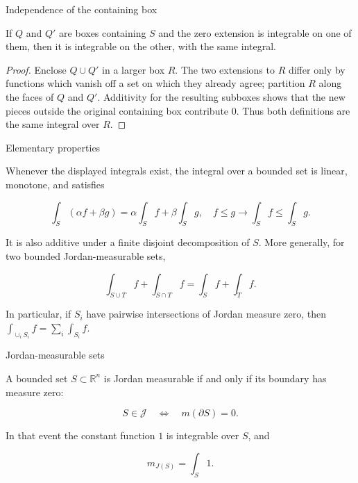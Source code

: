 \begin{lemma}{Independence of the containing box}

If \(Q\) and \(Q'\) are boxes containing \(S\) and the zero extension is integrable on one of them, then it is integrable on the other, with the same integral.

\end{lemma}

\begin{proof}

Enclose \(Q \cup Q'\) in a larger box \(R\). The two extensions to \(R\) differ only by functions which vanish off a set on which they already agree; partition \(R\) along the faces of \(Q\) and \(Q'\). Additivity for the resulting subboxes shows that the new pieces outside the original containing box contribute \(0\). Thus both definitions are the same integral over \(R\).

\end{proof}

\begin{proposition}{Elementary properties}

Whenever the displayed integrals exist, the integral over a bounded set is linear, monotone, and satisfies

\[\int_{S}\left( {\alpha f + \beta g} \right) = \alpha\int_{S}f + \beta\int_{S}g,\quad f \leq g\rightarrow\int_{S}f \leq \int_{S}g.\]

It is also additive under a finite disjoint decomposition of \(S\). More generally, for two bounded Jordan-measurable sets,

\[\int_{S \cup T}f + \int_{S \cap T}f = \int_{S}f + \int_{T}f.\]

In particular, if \(S_{i}\) have pairwise intersections of Jordan measure zero, then \(\int_{\cup_{i}S_{i}}f = \sum_{i}\int_{S_{i}}f\).

\end{proposition}

\begin{theorem}{Jordan-measurable sets}

A bounded set \(S \subset \mathbb{R}^{n}\) is Jordan measurable if and only if its boundary has measure zero:

\[S \in \mathcal{J}\quad\Leftrightarrow\quad m\left( {\partial S} \right) = 0.\]

In that event the constant function \(1\) is integrable over \(S\), and

\[m_{J{(S)}} = \int_{S}1.\]

\end{theorem}

